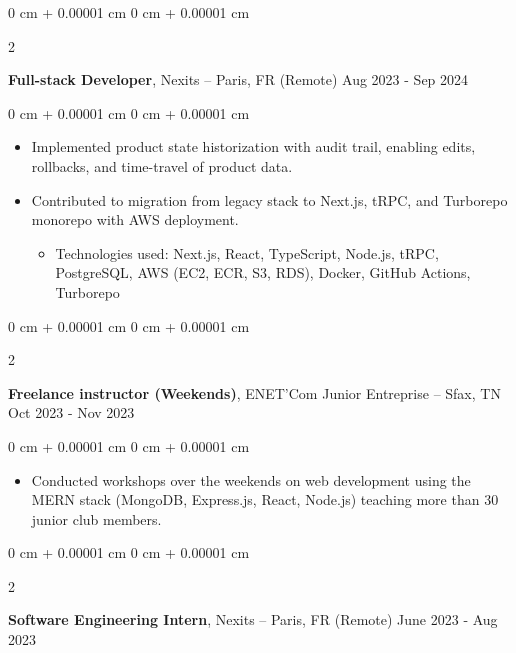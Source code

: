 \documentclass[10pt, letterpaper]{article}
\newenvironment{highlights}{
  \begin{itemize}[
    topsep=0.10 cm,
    parsep=0.10 cm,
    partopsep=0pt,
    itemsep=0pt,
    leftmargin=0 cm + 10pt
    ]
  }{
\end{itemize}
}
\newenvironment{highlightsforbulletentries}{
  \begin{itemize}[
    topsep=0 cm,
    parsep=0.10 cm,
    partopsep=0pt,
    itemsep=0pt,
    leftmargin=10pt
    ]
  }{
\end{itemize}
} %
\newenvironment{onecolentry}{
  \begin{adjustwidth}{
      0 cm + 0.00001 cm
    }{
      0 cm + 0.00001 cm
    }
  }{
  \end{adjustwidth}
} %
\newenvironment{twocolentry}[2][]{
  \onecolentry
  \def\secondColumn{#2}
  \setcolumnwidth{\fill, 4.5 cm}
  \begin{paracol}{2}
  }{
    \switchcolumn \raggedleft \secondColumn
  \end{paracol}
  \end{onecolentry}
} %
\begin{document}
  \begin{twocolentry}{
      Aug 2023 - Sep 2024
    }
  \textbf{Full-stack Developer}, Nexits  -- Paris, FR (Remote)\end{twocolentry}

  \vspace{0.10 cm}
  \begin{onecolentry}
    \begin{highlights}

  \item Implemented product state historization with audit trail, enabling edits, rollbacks, and time-travel of product data.
  \item Contributed to migration from legacy stack to Next.js, tRPC, and Turborepo monorepo with AWS deployment.

                \begin{highlightsforbulletentries}
    \item Technologies used: Next.js, React, TypeScript, Node.js, tRPC, PostgreSQL, AWS (EC2, ECR, S3, RDS), Docker, GitHub Actions, Turborepo
    \end{highlightsforbulletentries}


    \end{highlights}

  \end{onecolentry}


    \begin{twocolentry}{
      Oct 2023 - Nov 2023
    }
  \textbf{Freelance instructor (Weekends)}, ENET’Com Junior Entreprise  -- Sfax, TN\end{twocolentry}

  \vspace{0.10 cm}
  \begin{onecolentry}
    \begin{highlights}

    \item Conducted workshops over the weekends on web development using the MERN stack (MongoDB, Express.js, React, Node.js) teaching more than 30 junior club members.


    \end{highlights}

  \end{onecolentry}




  \begin{twocolentry}{
      June 2023 - Aug 2023
    }
  \textbf{Software Engineering Intern}, Nexits  -- Paris, FR (Remote)\end{twocolentry}
\end{document}
